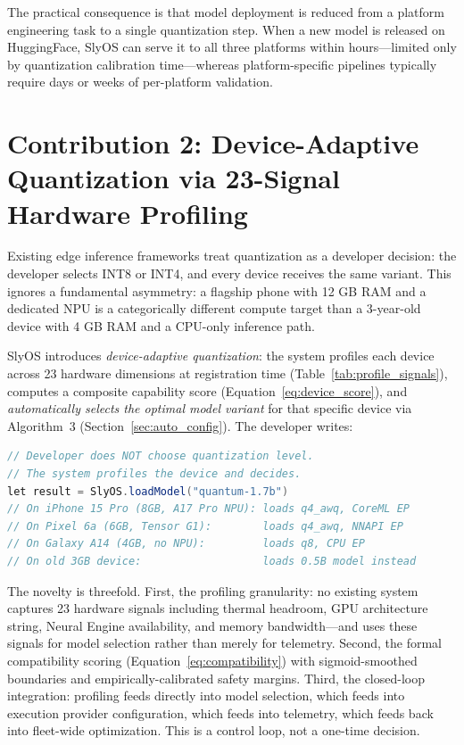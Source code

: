 \documentclass[12pt, letterpaper, twoside]{report}
\begin{document}
The practical consequence is that model deployment is reduced from a platform engineering task to a single quantization step. When a new model is released on HuggingFace, SlyOS can serve it to all three platforms within hours---limited only by quantization calibration time---whereas platform-specific pipelines typically require days or weeks of per-platform validation.

\section{Contribution 2: Device-Adaptive Quantization via 23-Signal Hardware Profiling}
\label{sec:novel_profiling}

Existing edge inference frameworks treat quantization as a developer decision: the developer selects INT8 or INT4, and every device receives the same variant. This ignores a fundamental asymmetry: a flagship phone with 12 GB RAM and a dedicated NPU is a categorically different compute target than a 3-year-old device with 4 GB RAM and a CPU-only inference path.

SlyOS introduces \textit{device-adaptive quantization}: the system profiles each device across 23 hardware dimensions at registration time (Table~\ref{tab:profile_signals}), computes a composite capability score (Equation~\ref{eq:device_score}), and \textit{automatically selects the optimal model variant} for that specific device via Algorithm~3 (Section~\ref{sec:auto_config}). The developer writes:

\begin{lstlisting}[language=Java, caption={Device-adaptive model loading---developer specifies intent, system selects variant}]
// Developer does NOT choose quantization level.
// The system profiles the device and decides.
let result = SlyOS.loadModel("quantum-1.7b")
// On iPhone 15 Pro (8GB, A17 Pro NPU): loads q4_awq, CoreML EP
// On Pixel 6a (6GB, Tensor G1):        loads q4_awq, NNAPI EP
// On Galaxy A14 (4GB, no NPU):         loads q8, CPU EP
// On old 3GB device:                   loads 0.5B model instead
\end{lstlisting}

The novelty is threefold. First, the profiling granularity: no existing system captures 23 hardware signals including thermal headroom, GPU architecture string, Neural Engine availability, and memory bandwidth---and uses these signals for model selection rather than merely for telemetry. Second, the formal compatibility scoring (Equation~\ref{eq:compatibility}) with sigmoid-smoothed boundaries and empirically-calibrated safety margins. Third, the closed-loop integration: profiling feeds directly into model selection, which feeds into execution provider configuration, which feeds into telemetry, which feeds back into fleet-wide optimization. This is a control loop, not a one-time decision.
\end{document}
